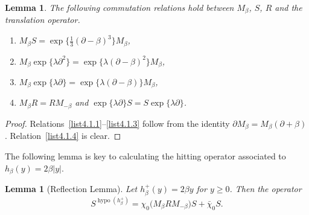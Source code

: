 \documentclass[10pt]{amsart}
\newtheorem{lemm}[theo]{Lemma}\newtheorem{prop}[theo]{Proposition}\newtheorem{coro}[theo]{Corollary}\newtheorem{conj}[theo]{Conjecture}
\theoremstyle{definition}\newtheorem{defi}[theo]{Definition}\newtheorem{rema}[theo]{Remark}\newtheorem{exam}[theo]{Example}\newtheorem{exem}[theo]{Example}\newtheorem{nota}[theo]{Notation}
\DeclareMathOperator{\hypo}{hypo}
\begin{document}
\begin{lemm} \label{lem:commutator}
The following commutation relations hold between $M_{\beta}$, $S$, $R$ and the translation operator.
\begin{enumerate}
\item \label{list4.1.1}$M_{\beta} S = \exp \big \{ \frac{1}{3}(\partial - \beta)^3 \big \} M_{\beta}$,
\item \label{list4.1.2}$M_{\beta} \exp \{ \lambda \partial^2 \} = \exp \{ \lambda (\partial - \beta)^2\} M_{\beta}$,
\item \label{list4.1.3}$M_{\beta} \exp \{ \lambda \partial \} = \exp \{ \lambda (\partial - \beta)\} M_{\beta}$,
\item \label{list4.1.4}$M_{\beta}R = R M_{-\beta}$ and $\exp \{\lambda \partial\} S = S \exp \{\lambda \partial \}$.
\end{enumerate}
\end{lemm}

\begin{proof}
Relations~\eqref{list4.1.1}--\eqref{list4.1.3} follow from the identity $\partial M_{\beta} = M_{\beta} (\partial + \beta)$. Relation~\eqref{list4.1.4} is clear.
\end{proof}

The following lemma is key to calculating the hitting operator associated to $h_{\beta}(y)= 2 \beta |y|$.

\begin{lemm}[Reflection Lemma] \label{lem:Shypo}
Let $h^{+}_{\beta}(y)= 2 \beta y$ for $y \geq 0$. Then the operator
\[
S^{\hypo(h^{+}_{\beta})} = \chi_0 \big(M_{\beta} R M_{-\beta} \big) S + \bar{\chi}_0 S.
\]
\end{lemm}
\end{document}
